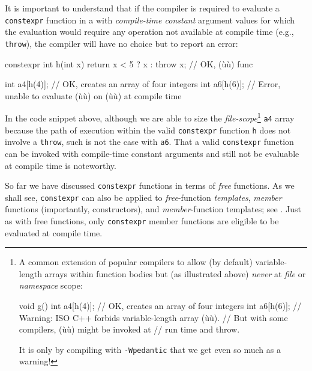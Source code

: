 It is important to understand that if the compiler is required to
evaluate a \lstinline!constexpr! function in a 
with \emph{compile-time constant} argument values for which the
evaluation would require any operation not available at compile time
(e.g., \lstinline!throw!), the compiler will have no choice but to report
an error:

\begin{emcppslisting}[emcppsbatch=e3]
constexpr int h(int x) { return x < 5 ? x : throw x; }  // OK, (ù{}ù) func

int a4[h(4)];  // OK, creates an array of four integers
int a6[h(6)];  // Error, unable to evaluate (ù{}ù) on (ù{}ù) at compile time
\end{emcppslisting}


\noindent In the code snippet above, although we are able to size the
\emph{file-scope}{\cprotect\footnote{A common extension of popular
compilers to allow (by default) variable-length arrays within function
bodies but (as illustrated above) \emph{never} at \emph{file} or
\emph{namespace} scope:

\begin{emcppslisting}[emcppsbatch=e3,style=footcode,emcppserrorlines={4}]
void g()
{
    int a4[h(4)];  // OK, creates an array of four integers
    int a6[h(6)];  // Warning: ISO C++ forbids variable-length array (ù{}ù).
                   // But with some compilers, (ù{}ù) might be invoked at
                   // run time and throw.
}
\end{emcppslisting}

\noindent It is only by compiling with \lstinline!-Wpedantic! that we get even so
  much as a warning!}} \lstinline!a4! array because the path of execution
within the valid \lstinline!constexpr! function \lstinline!h! does not involve
a \lstinline!throw!, such is not the case with \lstinline!a6!. That a valid
\lstinline!constexpr! function can be invoked with compile-time constant
arguments and still not be evaluable at compile time is noteworthy.

So far we have discussed \lstinline!constexpr! functions in terms of
\emph{free} functions. As we shall see, \lstinline!constexpr! can also be
applied to \emph{free}-function \emph{templates}, \emph{member}
functions (importantly, constructors), and \emph{member}-function
templates; see .
Just as with free functions, only \lstinline!constexpr! member functions
are eligible to be evaluated at compile time.

